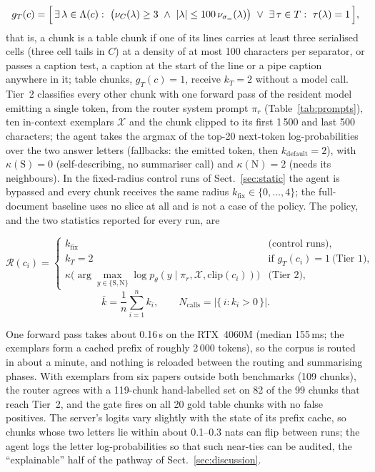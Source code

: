 \documentclass[pdflatex,sn-mathphys-num]{sn-jnl}
\theoremstyle{thmstyleone}%
\theoremstyle{thmstylethree}%
\begin{document}
\begin{equation}\label{eq:gate}
g_T(c)=\Bigl[\,\exists\,\lambda\in\Lambda(c):\ \bigl(\nu_{C}(\lambda)\ge 3\ \wedge\ |\lambda|\le 100\,\nu_{\sigma_{=}}(\lambda)\bigr)\ \vee\ \exists\,\tau\in T:\ \tau(\lambda)=1\,\Bigr],
\end{equation}
that is, a chunk is a table chunk if one of its lines carries at least three serialised cells (three cell tails in $C$) at a density of at most 100 characters per separator, or passes a caption test, a caption at the start of the line or a pipe caption anywhere in it; table chunks, $g_T(c)=1$, receive $k_T=2$ without a model call. Tier~2 classifies every other chunk with one forward pass of the resident model emitting a single token, from the router system prompt $\pi_r$ (Table~\ref{tab:prompts}), ten in-context exemplars $\mathcal X$ and the chunk clipped to its first 1\,500 and last 500 characters; the agent takes the argmax of the top-20 next-token log-probabilities over the two answer letters (fallbacks: the emitted token, then $k_{\mathrm{default}}=2$), with $\kappa(\mathrm S)=0$ (self-describing, no summariser call) and $\kappa(\mathrm N)=2$ (needs its neighbours). In the fixed-radius control runs of Sect.~\ref{sec:static} the agent is bypassed and every chunk receives the same radius $k_{\mathrm{fix}}\in\{0,\dots,4\}$; the full-document baseline uses no slice at all and is not a case of the policy. The policy, and the two statistics reported for every run, are

\begin{equation}
\mathcal R(c_i)=
\begin{cases}
k_{\mathrm{fix}} & \text{(control runs)},\\[2pt]
k_T=2 & \text{if } g_T(c_i)=1\ \text{(Tier 1)},\\[2pt]
\kappa\bigl(\arg\max_{y\in\{\mathrm S,\mathrm N\}}\log p_\theta(y\mid \pi_r,\mathcal X,\mathrm{clip}(c_i))\bigr) & \text{(Tier 2)},
\end{cases}
\end{equation}
\begin{equation}
\bar k=\frac1n\sum_{i=1}^{n}k_i,\qquad N_{\mathrm{calls}}=\bigl|\{\,i : k_i>0\,\}\bigr| .
\end{equation}

 One forward pass takes about 0.16\,s on the RTX~4060M (median 155\,ms; the exemplars form a cached prefix of roughly 2\,000 tokens), so the corpus is routed in about a minute, and nothing is reloaded between the routing and summarising phases. With exemplars from six papers outside both benchmarks (109 chunks), the router agrees with a 119-chunk hand-labelled set on 82 of the 99 chunks that reach Tier~2, and the gate fires on all 20 gold table chunks with no false positives. The server's logits vary slightly with the state of its prefix cache, so chunks whose two letters lie within about 0.1--0.3 nats can flip between runs; the agent logs the letter log-probabilities so that such near-ties can be audited, the ``explainable'' half of the pathway of Sect.~\ref{sec:discussion}.
\end{document}
